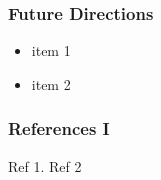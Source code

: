 \documentclass{beamer}
\begin{document}
\begin{frame}
\frametitle{Future Directions} 

\begin{itemize}
\item  item 1
\item item 2

\end{itemize}


\end{frame}

\begin{frame}
\frametitle{References I} 
\scriptsize{
Ref 1.}
\vskip10pt
\scriptsize{Ref 2}
\end{frame}
\end{document}
